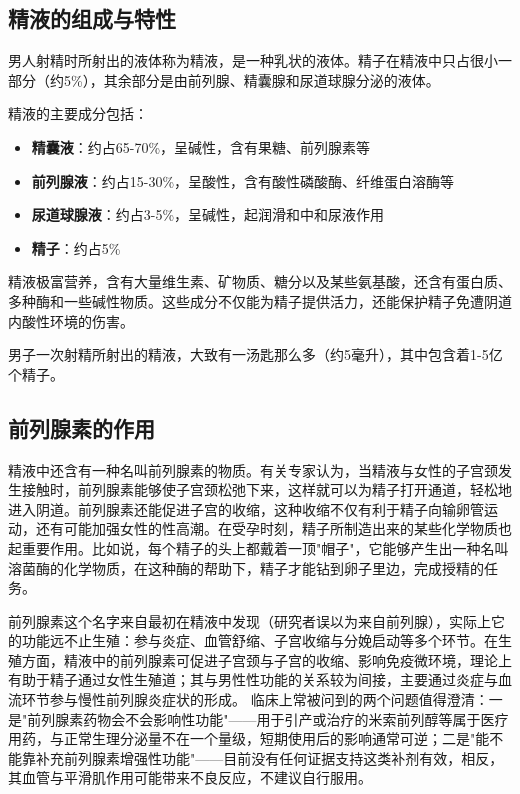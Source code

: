 \subsection{精液的组成与特性}

男人射精时所射出的液体称为精液，是一种乳状的液体。精子在精液中只占很小一部分（约5\%），其余部分是由前列腺、精囊腺和尿道球腺分泌的液体。

精液的主要成分包括：
\begin{itemize}
    \item \textbf{精囊液}：约占65-70\%，呈碱性，含有果糖、前列腺素等
    \item \textbf{前列腺液}：约占15-30\%，呈酸性，含有酸性磷酸酶、纤维蛋白溶酶等
    \item \textbf{尿道球腺液}：约占3-5\%，呈碱性，起润滑和中和尿液作用
    \item \textbf{精子}：约占5\%
\end{itemize}

精液极富营养，含有大量维生素、矿物质、糖分以及某些氨基酸，还含有蛋白质、多种酶和一些碱性物质。这些成分不仅能为精子提供活力，还能保护精子免遭阴道内酸性环境的伤害。

男子一次射精所射出的精液，大致有一汤匙那么多（约5毫升），其中包含着1-5亿个精子。

\subsection{前列腺素的作用}

精液中还含有一种名叫前列腺素的物质。有关专家认为，当精液与女性的子宫颈发生接触时，前列腺素能够使子宫颈松弛下来，这样就可以为精子打开通道，轻松地进入阴道。前列腺素还能促进子宫的收缩，这种收缩不仅有利于精子向输卵管运动，还有可能加强女性的性高潮。在受孕时刻，精子所制造出来的某些化学物质也起重要作用。比如说，每个精子的头上都戴着一顶"帽子"，它能够产生出一种名叫溶菌酶的化学物质，在这种酶的帮助下，精子才能钻到卵子里边，完成授精的任务。


前列腺素这个名字来自最初在精液中发现（研究者误以为来自前列腺），实际上它的功能远不止生殖：参与炎症、血管舒缩、子宫收缩与分娩启动等多个环节。在生殖方面，精液中的前列腺素可促进子宫颈与子宫的收缩、影响免疫微环境，理论上有助于精子通过女性生殖道；其与男性性功能的关系较为间接，主要通过炎症与血流环节参与慢性前列腺炎症状的形成。
临床上常被问到的两个问题值得澄清：一是"前列腺素药物会不会影响性功能"——用于引产或治疗的米索前列醇等属于医疗用药，与正常生理分泌量不在一个量级，短期使用后的影响通常可逆；二是"能不能靠补充前列腺素增强性功能"——目前没有任何证据支持这类补剂有效，相反，其血管与平滑肌作用可能带来不良反应，不建议自行服用。

